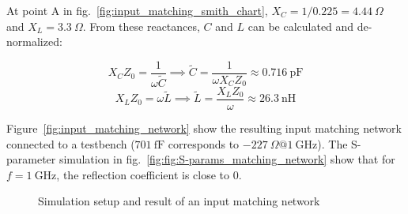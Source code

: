 \documentclass[report.tex]{subfiles}
\begin{document}
At point A in fig.~\ref{fig:input_matching_smith_chart}, $X_C=1/0.225=4.44~\Omega$ and $X_L=3.3~\Omega$. From these reactances, $C$ and $L$ can be calculated and de-normalized:

\begin{equation*}
    X_C Z_0 = \frac{1}{\omega \tilde{C}} \implies
    \tilde{C} = \frac{1}{\omega X_C Z_0} \approx 0.716 ~\text{pF}
\end{equation*}
\begin{equation*}
    X_L Z_0=\omega \tilde{L} \implies 
    \tilde{L}=\frac{X_L Z_0}{\omega} \approx 26.3~\text{nH}
\end{equation*}

Figure~\ref{fig:input_matching_network} show the resulting input matching network connected to a testbench ($701~\text{fF}$ corresponds to $-227~\Omega@1~\text{GHz}$). The S-parameter simulation in fig.~\ref{fig:fig:S-params_matching_network} show that for $f=1~\text{GHz}$, the reflection coefficient is close to 0.

\begin{figure}
    \centering
    
    \caption{Simulation setup and result of an input matching network}
\end{figure}

\clearpage %
\end{document}
